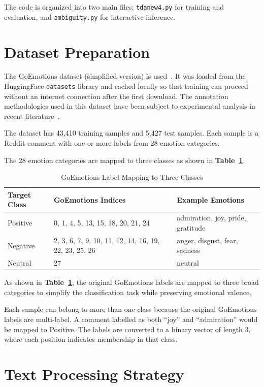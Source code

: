 The code is organized into two main files: \texttt{tdanew4.py} for training and evaluation, and
\texttt{ambiguity.py} for interactive inference.

\section{Dataset Preparation}

The GoEmotions dataset (simplified version) is used~\cite{goemotions}. It was loaded from the HuggingFace
\texttt{datasets} library and cached locally so that training can proceed without an internet
connection after the first download. The annotation methodologies used in this dataset have
been subject to experimental analysis in recent literature~\cite{emotion_annotation}.

The dataset has 43,410 training samples and 5,427 test samples. Each sample is a Reddit
comment with one or more labels from 28 emotion categories.

The 28 emotion categories are mapped to three classes as shown in \textbf{Table~\ref{tab:label_map}}.

\begin{table}[H]
\centering
\caption{GoEmotions Label Mapping to Three Classes}
\label{tab:label_map}
\begin{tabular}{llp{5cm}}
\toprule
\textbf{Target Class} & \textbf{GoEmotions Indices} & \textbf{Example Emotions} \\
\midrule
Positive & 0, 1, 4, 5, 13, 15, 18, 20, 21, 24 & admiration, joy, pride, gratitude \\
Negative & 2, 3, 6, 7, 9, 10, 11, 12, 14, 16, 19, 22, 23, 25, 26 & anger, disgust, fear, sadness \\
Neutral  & 27 & neutral \\
\bottomrule
\end{tabular}
\end{table}

As shown in \textbf{Table~\ref{tab:label_map}}, the original GoEmotions labels are mapped to three
broad categories to simplify the classification task while preserving emotional valence.

Each sample can belong to more than one class because the original GoEmotions labels are
multi-label. A comment labelled as both ``joy'' and ``admiration'' would be mapped to Positive.
The labels are converted to a binary vector of length 3, where each position indicates membership
in that class.

\section{Text Processing Strategy}


